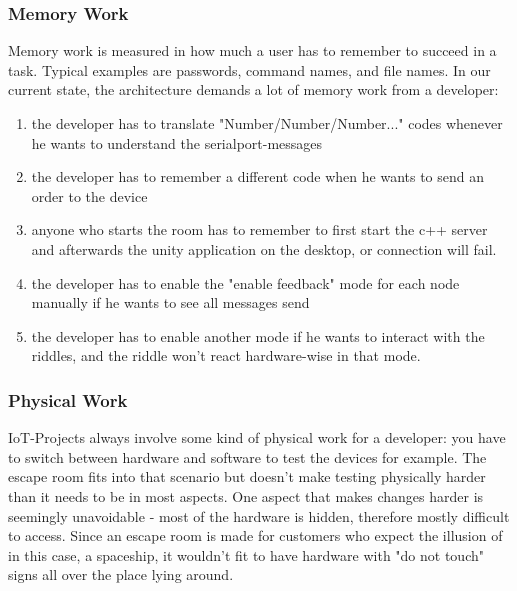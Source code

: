 \subsubsection{Memory Work}
Memory work is measured in how much a user has to remember to succeed in a task. 
Typical examples are passwords, command names, and file names.
In our current state, the architecture demands a lot of memory work from a developer:
\begin{enumerate}
    \item the developer has to translate "Number/Number/Number..." codes whenever he wants to understand the serialport-messages 
    \item the developer has to remember a different code when he wants to send an order to the device
    \item anyone who starts the room has to remember to first start the c++ server and afterwards the unity application on the desktop, or connection will fail.
    \item the developer has to enable the "enable feedback" mode for each node manually if he wants to see all messages send
    \item the developer has to enable another mode if he wants to interact with the riddles, and the riddle won't react hardware-wise in that mode.
\end{enumerate} 

\subsubsection{Physical Work}
IoT-Projects always involve some kind of physical work for a developer: you have to switch between hardware and software to test the devices for example.
The escape room fits into that scenario but doesn't make testing physically harder than it needs to be in most aspects. 
One aspect that makes changes harder is seemingly unavoidable - most of the hardware is hidden, therefore mostly difficult to access. 
Since an escape room is made for customers who expect the illusion of in this case, a spaceship, 
it wouldn't fit to have hardware with "do not touch" signs all over the place lying around.

